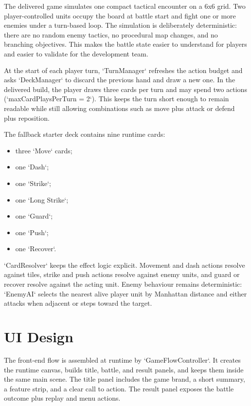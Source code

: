 The delivered game simulates one compact tactical encounter on a 6x6 grid. Two player-controlled units occupy the board at battle start and fight one or more enemies under a turn-based loop. The simulation is deliberately deterministic: there are no random enemy tactics, no procedural map changes, and no branching objectives. This makes the battle state easier to understand for players and easier to validate for the development team.

At the start of each player turn, `TurnManager` refreshes the action budget and asks `DeckManager` to discard the previous hand and draw a new one. In the delivered build, the player draws three cards per turn and may spend two actions (`maxCardPlaysPerTurn = 2`). This keeps the turn short enough to remain readable while still allowing combinations such as move plus attack or defend plus reposition.

The fallback starter deck contains nine runtime cards:

\begin{itemize}
    \item three `Move` cards;
    \item one `Dash`;
    \item one `Strike`;
    \item one `Long Strike`;
    \item one `Guard`;
    \item one `Push`;
    \item one `Recover`.
\end{itemize}

`CardResolver` keeps the effect logic explicit. Movement and dash actions resolve against tiles, strike and push actions resolve against enemy units, and guard or recover resolve against the acting unit. Enemy behaviour remains deterministic: `EnemyAI` selects the nearest alive player unit by Manhattan distance and either attacks when adjacent or steps toward the target.

\section{UI Design}

The front-end flow is assembled at runtime by `GameFlowController`. It creates the runtime canvas, builds title, battle, and result panels, and keeps them inside the same main scene. The title panel includes the game brand, a short summary, a feature strip, and a clear call to action. The result panel exposes the battle outcome plus replay and menu actions.

